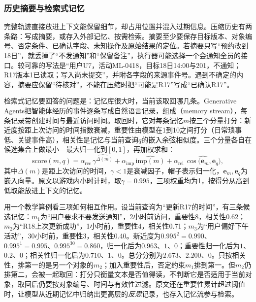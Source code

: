 \subsubsection{历史摘要与检索式记忆}
\label{sec:nlp-execution-history}

完整轨迹直接放进上下文能保留细节，却占用位置并混入过期信息。压缩历史有两条路：写成摘要，或存入外部记忆、按需检索。摘要至少要保存目标版本、对象编号、否定条件、已确认字段、未知操作及原始结果的定位。若摘要只写“预约改到18日”，就丢掉了“不发通知”和“保留备注”，执行器可能选择一个会通知全员的接口。较可靠的写法是“用户U7，活动ML-0418，目标18日14:00与201，不通知；R17版本1已读取；写入尚未提交”，并附各字段的来源事件号。遇到不确定的内容，摘要应保留“待核对”，不能在压缩时把“可能是R17”写成“已确认R17”。

检索式记忆要回答的问题是：记忆库很大时，当前该取回哪几条。Generative Agents把智能体经历的事件逐条写成自然语言记录，组成（memory stream），每条记录带创建时间与最近访问时间。取回时，它对每条记忆$m$按三个分量打分：新近度按距上次访问的时间指数衰减，重要性由模型在1到10之间打分（日常琐事低、关键事件高），相关性是记忆与当前查询$q$的嵌入余弦相似度。三个分量各自在候选集合上做最小—最大归一化到$[0,1]$，再加权求和：
\begin{equation}
 \mathrm{score}(m,q)=\alpha_{\mathrm{rec}}\,\widehat{\gamma^{\Delta(m)}}
 +\alpha_{\mathrm{imp}}\,\widehat{\mathrm{imp}(m)}
 +\alpha_{\mathrm{rel}}\,\widehat{\cos\bigl(\bm{e}_m,\bm{e}_q\bigr)},
 \label{eq:nlp-execution-memory-score}
\end{equation}
其中$\Delta(m)$是距上次访问的时间，$\gamma<1$是衰减因子，帽子表示归一化，$\bm{e}_m,\bm{e}_q$为嵌入向量。原文以游戏内小时计时，取$\gamma=0.995$，三项权重均为1，按得分从高到低取能放进上下文的记忆。

用一个教学算例看三项如何相互作用。设当前查询为“更新R17的时间”，有三条候选记忆：$m_1$为“用户要求不要发送通知”，2小时前访问，重要性8，相关性0.62；$m_2$为“R18上次更新成功”，1小时前，重要性4，相关性0.71；$m_3$为“用户偏好下午活动”，30小时前，重要性3，相关性0.40。新近度为$0.995^2=0.990$、$0.995^1=0.995$、$0.995^{30}=0.860$，归一化后为$0.963$、$1$、$0$；重要性归一化后为$1$、$0.2$、$0$；相关性归一化后为$0.710$、$1$、$0$。总分分别为$2.673$、$2.200$、$0$。只按相关性，排第一的是另一个对象的$m_2$；加入重要性后，否定约束$m_1$排到第一。但$m_2$仍排第二，会被一起取回：打分只衡量文本是否值得读，不判断它是否适用于当前对象，取回后仍要按对象编号、时间与有效性过滤。原文还在重要性累计超过阈值时，让模型从近期记忆中归纳出更高层的\emph{反思}记录，也存入记忆流参与检索。

